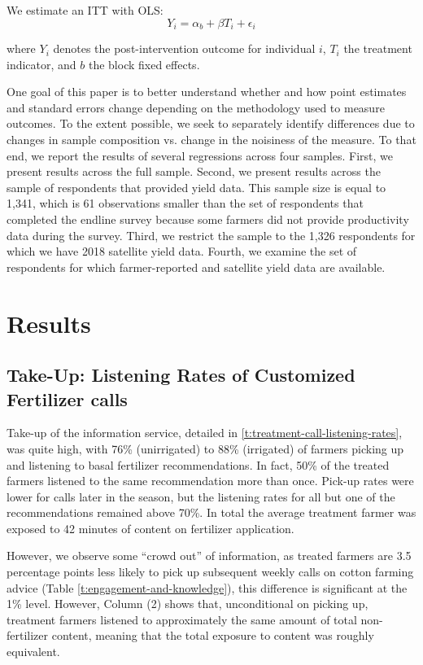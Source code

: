 \documentclass{article}
\begin{document}
We estimate an ITT with OLS:
$$
Y_i = \alpha_b + \beta T_i + \epsilon_i
$$

where $Y_i$ denotes the post-intervention outcome for individual $i$, $T_i$ the treatment indicator, and $b$ the block fixed effects.

One goal of this paper is to better understand whether and how point estimates and standard errors change depending on the methodology used to measure outcomes. To the extent possible, we seek to separately identify differences due to changes in sample composition vs. change in the noisiness of the measure. To that end, we report the results of several regressions across four samples. First, we present results across the full sample. Second, we present results across the sample of respondents that provided yield data. This sample size is equal to 1,341, which is 61 observations smaller than the set of respondents that completed the endline survey because some farmers did not provide productivity data during the survey. Third, we restrict the sample to the 1,326 respondents for which we have 2018 satellite yield data. Fourth, we examine the set of respondents for which farmer-reported and satellite yield data are available. 

\section{Results}

\subsection{Take-Up: Listening Rates of Customized Fertilizer calls}

Take-up of the information service, detailed in \ref{t:treatment-call-listening-rates}, was quite high, with 76\% (unirrigated) to 88\% (irrigated) of farmers picking up and listening to basal fertilizer recommendations. In fact, 50\% of the treated farmers listened to the same recommendation more than once. Pick-up rates were lower for calls later in the season, but the listening rates for all but one of the recommendations remained above 70\%. In total the average treatment farmer was exposed to 42 minutes of content on fertilizer application.

However, we observe some ``crowd out'' of information, as treated farmers are 3.5 percentage points less likely to pick up subsequent weekly calls on cotton farming advice (Table \ref{t:engagement-and-knowledge}), this difference is significant at the 1\% level. However, Column (2) shows that, unconditional on picking up, treatment farmers listened to approximately the same amount of total non-fertilizer content, meaning that the total exposure to content was roughly equivalent. 
\end{document}

